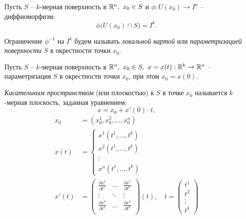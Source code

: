 \begin{definition}
    Пусть $S$ -- $k$-мерная поверхность в $\mathbb{R}^n, \ x_0 \in S$ и $\phi: U(x_0) \rightarrow I^n$ -- диффиоморфизм:
    \[
        \phi\big(U(x_0)\cap S\big) = I^k.
    \]

    Ограничение $\phi^{-1}$ на $I^k$ будем называть \emph{локальной картой} или \emph{параметризацией поверхности} $S$ в окрестности точки $x_0$.
\end{definition}

\begin{definition}
    Пусть $ S $ -- $ k $-мерная поверхность в $ \mathbb{R}^n, \ x_0 \in S, \ x = x(t):\mathbb{R}^k \rightarrow \mathbb{R}^n $ -- параметризация $ S $ в окрестности точки $ x_0 $, при этом $ x_0 = x(0) $.

    \emph{Касательным пространством} (или плоскостью) к $S$ в точке $x_0$ называется $k$-мерная плоскость, заданная уравнением:
    \begin{equation}\label{eq:8}
        x = x_0 + x'(0) \cdot t,
    \end{equation}
    \begin{align*}
        x_0   & = (x^1_0,x^2_0,\ldots,x^n_0)                                                   \\
        x(t)  & = \left\{\begin{array}{l}
                             x^1(t^1,\ldots,t^k) \\
                             x^2(t^1,\ldots,t^k) \\
                             \vdots              \\
                             x^n(t^1,\ldots,t^k)
                         \end{array}\right.                                                   \\
        x'(t) & = \left(\begin{matrix}
                                \frac{\partial x^1}{\partial t^1} & \ldots & \frac{\partial x^1}{\partial t^k} \\
                                \vdots                        & \ddots & \vdots                        \\
                                \frac{\partial x^n}{\partial t^1} & \ldots & \frac{\partial x^n}{\partial t^k} \\
                            \end{matrix}\right)(t), \quad t = \left(\begin{matrix}
                                                                        t^1 \\ t^2 \\ \vdots \\ t^k
                                                                    \end{matrix}\right)
    \end{align*}


\end{definition}
